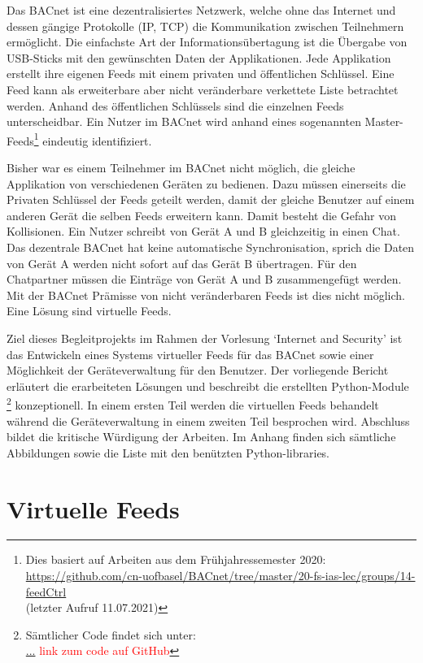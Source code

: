 \documentclass[a4paper,titlepage]{article}
\begin{document}
Das BACnet ist eine dezentralisiertes Netzwerk, welche ohne das Internet und dessen gängige Protokolle (IP, TCP) die Kommunikation zwischen Teilnehmern ermöglicht. Die einfachste Art der Informationsübertagung ist die Übergabe von USB-Sticks mit den gewünschten Daten der Applikationen. Jede Applikation erstellt ihre eigenen Feeds mit einem privaten und öffentlichen Schlüssel. Eine Feed kann als erweiterbare aber nicht veränderbare verkettete Liste betrachtet werden. Anhand des öffentlichen Schlüssels sind die einzelnen Feeds unterscheidbar. Ein Nutzer im BACnet wird anhand eines sogenannten Master-Feeds\footnote{Dies basiert auf Arbeiten aus dem Frühjahressemester 2020: \\ \url{https://github.com/cn-uofbasel/BACnet/tree/master/20-fs-ias-lec/groups/14-feedCtrl} \\ (letzter Aufruf 11.07.2021)} eindeutig identifiziert.

Bisher war es einem Teilnehmer im BACnet nicht möglich, die gleiche Applikation von verschiedenen Geräten zu bedienen. Dazu müssen einerseits die Privaten Schlüssel der Feeds geteilt werden, damit der gleiche Benutzer auf einem anderen Gerät die selben Feeds erweitern kann. Damit besteht die Gefahr von Kollisionen. Ein Nutzer schreibt von Gerät A und B gleichzeitig in einen Chat. Das dezentrale BACnet hat keine automatische Synchronisation, sprich die Daten von Gerät A werden nicht sofort auf das Gerät B übertragen. Für den Chatpartner müssen die Einträge von Gerät A und B zusammengefügt werden. Mit der BACnet Prämisse von nicht veränderbaren Feeds ist dies nicht möglich. Eine Lösung sind virtuelle Feeds.

Ziel dieses Begleitprojekts im Rahmen der Vorlesung `Internet and Security' ist das Entwickeln eines Systems virtueller Feeds für das BACnet sowie einer Möglichkeit der Geräteverwaltung für den Benutzer. Der vorliegende Bericht erläutert die erarbeiteten Lösungen und beschreibt die erstellten Python-Module \footnote{Sämtlicher Code findet sich unter: \\ \url{...} \textcolor{red}{link zum code auf GitHub}} konzeptionell. In einem ersten Teil werden die virtuellen Feeds behandelt während die Geräteverwaltung in einem zweiten Teil besprochen wird. Abschluss bildet die kritische Würdigung der Arbeiten. Im Anhang finden sich sämtliche Abbildungen sowie die Liste mit den benützten Python-libraries.


\section{Virtuelle Feeds}
\end{document}
